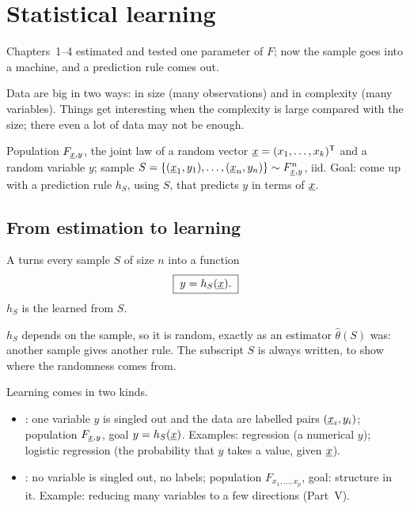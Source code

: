 \chapter{Statistical learning}

Chapters~1--4 estimated and tested one parameter of $F$; now the sample goes into a machine, and a prediction rule comes out.

Data are big in two ways: in size (many observations) and in complexity (many variables). Things get interesting when the complexity is large compared with the size; there even a lot of data may not be enough.

\begin{setup}
Population $F_{\underline{x},y}$, the joint law of a random vector $\underline{x}=(x_1,\dots,x_k)^{\mathsf{T}}$ and a random variable $y$; sample $S=\{(\underline{x}_1,y_1),\dots,(\underline{x}_n,y_n)\}\sim F^n_{\underline{x},y}$, iid. Goal: come up with a prediction rule $h_S$, using $S$, that predicts $y$ in terms of $\underline{x}$.
\end{setup}

\section{From estimation to learning}

\begin{definition}
A  turns every sample $S$ of size $n$ into a function
\[
  \boxed{\;y=h_S(\underline{x}).\;}
\]
$h_S$ is the  learned from $S$.
\end{definition}

$h_S$ depends on the sample, so it is random, exactly as an estimator $\hat\theta(S)$ was: another sample gives another rule. The subscript $S$ is always written, to show where the randomness comes from.

\begin{definition}
Learning comes in two kinds.
\begin{itemize}
  \item {}: one variable $y$ is singled out and the data are labelled pairs $(\underline{x}_i,y_i)$; population $F_{\underline{x},y}$, goal $y=h_S(\underline{x})$. Examples: regression (a numerical $y$); logistic regression (the probability that $y$ takes a value, given $\underline{x}$).
  \item {}: no variable is singled out, no labels; population $F_{x_1,\dots,x_p}$, goal: structure in it. Example: reducing many variables to a few directions (Part~V).
\end{itemize}
\end{definition}

